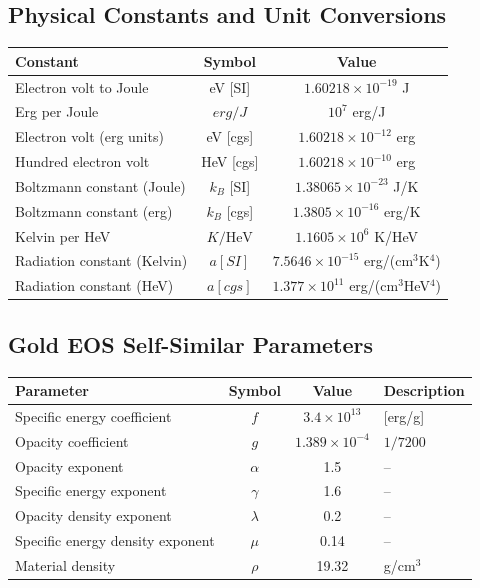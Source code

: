 \documentclass{article}
\begin{document}
\subsection{Physical Constants and Unit Conversions}
\renewcommand{\arraystretch}{1.5}
\begin{center}
\begin{tabular}{|l|c|c|}
    \hline
    \textbf{Constant} & \textbf{Symbol} & \textbf{Value} \\
    \hline
    Electron volt to Joule & eV [SI] & $1.60218 \times 10^{-19}$ J \\
    \hline
    Erg per Joule & $erg/J$ & $10^7$ erg/J \\
    \hline
    Electron volt (erg units) & eV [cgs] & $1.60218 \times 10^{-12}$ erg \\
    \hline
    Hundred electron volt & HeV [cgs] & $1.60218 \times 10^{-10}$ erg \\
    \hline
    Boltzmann constant (Joule) & $k_B$ [SI] & $1.38065 \times 10^{-23}$ J/K \\
    \hline
    Boltzmann constant (erg) & $k_B$ [cgs] & $1.3805 \times 10^{-16}$ erg/K \\
    \hline
    Kelvin per HeV & $K/\mathrm{HeV}$ & $1.1605 \times 10^6$ K/HeV \\
    \hline
    Radiation constant (Kelvin) & $a [SI]$ & $7.5646 \times 10^{-15}$ erg/(cm$^3$K$^4$) \\
    \hline
    Radiation constant (HeV) & $a [cgs]$ & $1.377 \times 10^{11}$ erg/(cm$^3$HeV$^4$) \\
    \hline
\end{tabular}
\end{center}
\renewcommand{\arraystretch}{1}

\subsection{Gold EOS Self-Similar Parameters}
\renewcommand{\arraystretch}{1.5}
\begin{center}
\begin{tabular}{|l|c|c|l|}
    \hline
    \textbf{Parameter} & \textbf{Symbol} & \textbf{Value} & \textbf{Description} \\
    \hline
    Specific energy coefficient & $f$ & $3.4 \times 10^{13}$ & [erg/g] \\
    \hline
    Opacity coefficient & $g$ & $1.389 \times 10^{-4}$ & $1/7200$ \\
    \hline
    Opacity exponent & $\alpha$ & 1.5 & -- \\
    \hline
    Specific energy exponent & $\gamma$ & 1.6 & -- \\
    \hline
    Opacity density exponent & $\lambda$ & 0.2 & -- \\
    \hline
    Specific energy density exponent & $\mu$ & 0.14 & -- \\
    \hline
    Material density & $\rho$ & 19.32 & g/cm$^3$ \\
    \hline
\end{tabular}
\end{center}
\renewcommand{\arraystretch}{1}
\end{document}
